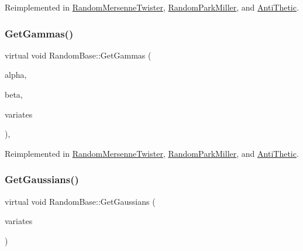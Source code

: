 Reimplemented in \hyperlink{classRandomMersenneTwister_add67fcdb019b8f0eb43c50d3cdf1f8c1}{Random\+Mersenne\+Twister}, \hyperlink{classRandomParkMiller_a33b21750d1694fec01ed7c10d49e8fba}{Random\+Park\+Miller}, and \hyperlink{classAntiThetic_aa4ee18288564b74c7a2d7e5015e87d6c}{Anti\+Thetic}.

\hypertarget{classRandomBase_a5b5c89afe295ba49a5474cdc3bf80c3d}{}\label{classRandomBase_a5b5c89afe295ba49a5474cdc3bf80c3d} 
\subsubsection{\texorpdfstring{Get\+Gammas()}{GetGammas()}}
{\footnotesize\ttfamily virtual void Random\+Base\+::\+Get\+Gammas (\begin{DoxyParamCaption}\item[{double}]{alpha,  }\item[{double}]{beta,  }\item[{\hyperlink{classMJArray}{M\+J\+Array} \&}]{variates }\end{DoxyParamCaption})\hspace{0.3cm}{\ttfamily [inline]}, {\ttfamily [virtual]}}



Reimplemented in \hyperlink{classRandomMersenneTwister_a6bc8dbc22f258488161f800580574c0f}{Random\+Mersenne\+Twister}, \hyperlink{classRandomParkMiller_a819811663cba7da72678c0a05aae62ce}{Random\+Park\+Miller}, and \hyperlink{classAntiThetic_a367486230368c4624cabf6172b97dafe}{Anti\+Thetic}.

\hypertarget{classRandomBase_aac297a1b64959492831f5e9a1f28c03d}{}\label{classRandomBase_aac297a1b64959492831f5e9a1f28c03d} 
\subsubsection{\texorpdfstring{Get\+Gaussians()}{GetGaussians()}\hspace{0.1cm}{\footnotesize\ttfamily [1/2]}}
{\footnotesize\ttfamily virtual void Random\+Base\+::\+Get\+Gaussians (\begin{DoxyParamCaption}\item[{\hyperlink{classMJArray}{M\+J\+Array} \&}]{variates }\end{DoxyParamCaption})\hspace{0.3cm}{\ttfamily [virtual]}}



